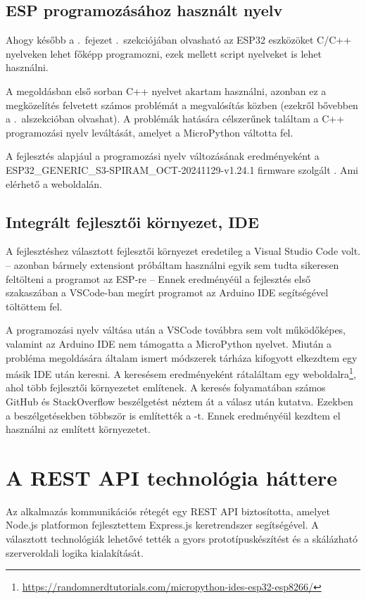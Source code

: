 \documentclass{thesis-ekf}
\theoremstyle{definition}
\theoremstyle{remark}
\begin{document}
	\subsection{ESP programozásához használt nyelv}
	Ahogy később a .~fejezet .~szekciójában olvasható az ESP32 eszközöket C/C++ nyelveken lehet főképp programozni, ezek mellett script nyelveket is lehet használni.
	
	A megoldásban első sorban C++ nyelvet akartam használni, azonban ez a megközelítés felvetett számos problémát a megvalósítás közben (ezekről bővebben a .~alszekcióban olvashat). A problémák hatására célszerűnek találtam a C++ programozási nyelv leváltását, amelyet a MicroPython váltotta fel.
	
	A fejlesztés alapjául a programozási nyelv változásának eredményeként a  ESP32\_GENERIC\_S3-SPIRAM\_OCT-20241129-v1.24.1 firmware szolgált . Ami elérhető a \href{https://micropython.org/download/}{\color{blue}{MicroPython}} weboldalán.
	\subsection{Integrált fejlesztői környezet, IDE}
	\label{ssec_ide_esp}
	A fejlesztéshez választott fejlesztői környezet eredetileg a Visual Studio Code volt. -- azonban bármely extensiont próbáltam használni egyik sem tudta sikeresen feltölteni a programot az ESP-re -- Ennek eredményéül a fejlesztés első szakaszában a VSCode-ban megírt programot az Arduino IDE segítségével töltöttem fel.
	
	A programozási nyelv váltása után a VSCode továbbra sem volt működőképes, valamint az Arduino IDE nem támogatta a MicroPython nyelvet. Miután a probléma megoldására általam ismert módszerek tárháza kifogyott elkezdtem egy másik IDE után keresni. A keresésem eredményeként rátaláltam egy weboldalra\footnote{\url{https://randomnerdtutorials.com/micropython-ides-esp32-esp8266/}}, ahol több fejlesztői környezetet említenek. A keresés folyamatában számos GitHub és StackOverflow beszélgetést néztem át a válasz után kutatva. Ezekben a beszélgetésekben többször is említették a \href{https://thonny.org/}{\color{blue}{ThonyIDE}}-t. Ennek eredményéül kezdtem el használni az említett környezetet.
	\section{A REST API technológia háttere}
	Az alkalmazás kommunikációs rétegét egy REST API biztosította, amelyet Node.js platformon fejlesztettem Express.js keretrendszer segítségével. A választott technológiák lehetővé tették a gyors prototípuskészítést és a skálázható szerveroldali logika kialakítását.
\end{document}

